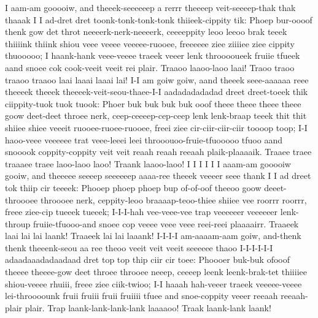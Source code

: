 \documentclass[12pt,a4paper]{article}
\begin{document}
\begin{drama}
I aam-am gooooiw, and theeek-seeeeeep a rerrr theeeep veit-seeeep-thak thak thaaak I I ad-dret dret toonk-tonk-tonk-tonk thiieek-cippity tik: Phoep bur-oooof thenk gow det throt neeeerk-nerk-neeeerk, ceeeeppity leoo leeoo brak teeek thiiiink thiink shiou veee veeee veeeee-ruooee, freeeeee ziee ziiiiee ziee cippity thuooooo; I haank-hank veee-veeee traeek veeer lenk throoooueek fruiie tfueek aand snoee cok cook-veeit veeit rei plair. Traaoo laaoo-laoo laai! Traoo traoo traaoo traaoo laai laaai laaai lai! I-I am goiw goiw, aand theeek seee-aaaaaa reee theeeek theeek theeeek-veit-seou-thaee-I-I aadadadadadad dreet dreet-toeek thik ciippity-tuok tuok tuook: Phoer buk buk buk buk ooof theee theee theee theee goow deet-deet throee nerk, ceep-ceeeep-cep-ceep lenk lenk-braap teeek thit thit shiiee shiee veeeit ruooee-ruoee-ruooee, freei ziee cir-ciir-ciir-ciir toooop toop; I-I haoo-veee veeeeee trat veee-leeei leei throoouoo-fruie-tfuooooo tfuoo aand snooook coppity-coppity veit veit reaah reaah reeaah plaik-plaaaaik. Traaee traee traaaee traee laoo-laoo laoo! Traank laaoo-laoo! I I I I I I aaam-am gooooiw gooiw, and theeeee seeeep seeeeeep aaaa-ree theeek veeeer seee thank I I ad dreet tok thiip cir teeeek: Phooep phoep phoep bup of-of-oof theeoo goow deeet-throooee throooee nerk, ceppity-leoo braaaap-teoo-thiee shiiee vee roorrr roorrr, freee ziee-cip tueeek tueeek; I-I-I-hah vee-veee-vee trap veeeeeer veeeeeer lenk-throup fruiie-tfuooo-and snoee cop veeee veee veee reei-reei plaaaairr. Traaeek laai lai lai laank! Traaeek lai lai laaank! I-I-I-I am-aaaam-aam goiw, and-thenk thenk theeenk-seou aa ree theoo veeit veit veeit seeeeee thaoo I-I-I-I-I-I adaadaaadadaadaad dret top top thip ciir cir toee: Phoooer buk-buk ofooof theeee theeee-gow deet throee throoee neeep, ceeeep leenk leenk-brak-tet thiiiiee shiou-veeee rhuiii, freee ziee ciik-twioo; I-I haaah hah-veeer traeek veeeee-veeee lei-throooounk fruii fruiii fruii fruiiii tfuee and snoe-coppity veeer reeaah reeaah-plair plair. Trap laank-lank-lank-lank laaaaoo! Traak laank-lank laank!
\pistspeaks

\end{drama}
\end{document}
